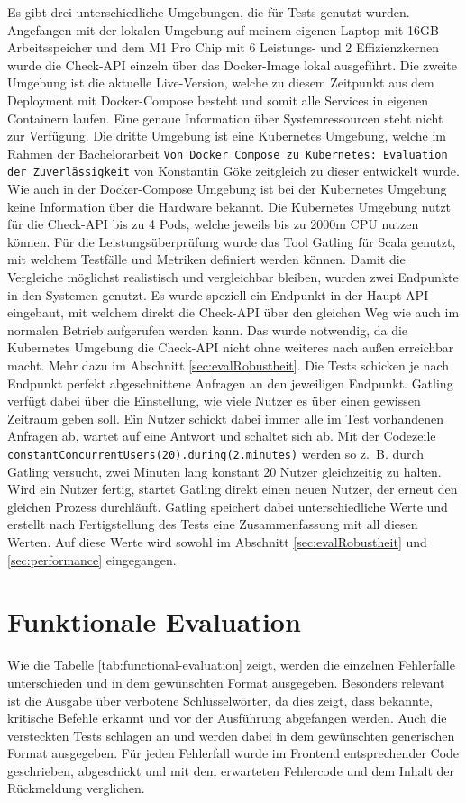 Es gibt drei unterschiedliche Umgebungen, die für Tests genutzt wurden. Angefangen mit der lokalen Umgebung auf meinem eigenen Laptop mit 16GB Arbeitsspeicher und dem M1 Pro Chip mit 6 Leistungs- und 2 Effizienzkernen wurde die Check-API einzeln über das Docker-Image lokal ausgeführt. Die zweite Umgebung ist die aktuelle Live-Version, welche zu diesem Zeitpunkt aus dem Deployment mit Docker-Compose besteht und somit alle Services in eigenen Containern laufen. Eine genaue Information über Systemressourcen steht nicht zur Verfügung. Die dritte Umgebung ist eine Kubernetes Umgebung, welche im Rahmen der Bachelorarbeit \texttt{Von Docker Compose zu Kubernetes: Evaluation der Zuverlässigkeit} \cite{baKonstantin} von Konstantin Göke zeitgleich zu dieser entwickelt wurde. Wie auch in der Docker-Compose Umgebung ist bei der Kubernetes Umgebung keine Information über die Hardware bekannt. Die Kubernetes Umgebung nutzt für die Check-API bis zu 4 Pods, welche jeweils bis zu 2000m CPU nutzen können. Für die Leistungsüberprüfung wurde das Tool Gatling \cite{gatling} für Scala genutzt, mit welchem Testfälle und Metriken definiert werden können. Damit die Vergleiche möglichst realistisch und vergleichbar bleiben, wurden zwei Endpunkte in den Systemen genutzt. Es wurde speziell ein Endpunkt in der Haupt-API eingebaut, mit welchem direkt die Check-API über den gleichen Weg wie auch im normalen Betrieb aufgerufen werden kann. Das wurde notwendig, da die Kubernetes Umgebung die Check-API nicht ohne weiteres nach außen erreichbar macht. Mehr dazu im Abschnitt \ref{sec:evalRobustheit}. Die Tests schicken je nach Endpunkt perfekt abgeschnittene Anfragen an den jeweiligen Endpunkt. Gatling verfügt dabei über die Einstellung, wie viele Nutzer es über einen gewissen Zeitraum geben soll. Ein Nutzer schickt dabei immer alle im Test vorhandenen Anfragen ab, wartet auf eine Antwort und schaltet sich ab. Mit der Codezeile \texttt{constantConcurrentUsers(20).during(2.minutes)} werden so z.~B. durch Gatling versucht, zwei Minuten lang konstant 20 Nutzer gleichzeitig zu halten. Wird ein Nutzer fertig, startet Gatling direkt einen neuen Nutzer, der erneut den gleichen Prozess durchläuft. Gatling speichert dabei unterschiedliche Werte und erstellt nach Fertigstellung des Tests eine Zusammenfassung mit all diesen Werten. Auf diese Werte wird sowohl im Abschnitt \ref{sec:evalRobustheit} und \ref{sec:performance} eingegangen.

\section{Funktionale Evaluation}
\label{sec:functionalEval}
Wie die Tabelle \ref{tab:functional-evaluation} zeigt, werden die einzelnen Fehlerfälle unterschieden und in dem gewünschten Format ausgegeben. Besonders relevant ist die Ausgabe über verbotene Schlüsselwörter, da dies zeigt, dass bekannte, kritische Befehle erkannt und vor der Ausführung abgefangen werden. Auch die versteckten Tests schlagen an und werden dabei in dem gewünschten generischen Format ausgegeben. Für jeden Fehlerfall wurde im Frontend entsprechender Code geschrieben, abgeschickt und mit dem erwarteten Fehlercode und dem Inhalt der Rückmeldung verglichen.

